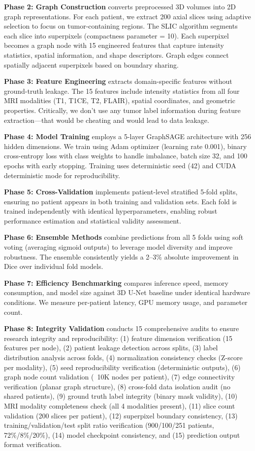 \textbf{Phase 2: Graph Construction} converts preprocessed 3D volumes into 2D graph representations. For each patient, we extract 200 axial slices using adaptive selection to focus on tumor-containing regions. The SLIC algorithm segments each slice into superpixels (compactness parameter = 10). Each superpixel becomes a graph node with 15 engineered features that capture intensity statistics, spatial information, and shape descriptors. Graph edges connect spatially adjacent superpixels based on boundary sharing.

\textbf{Phase 3: Feature Engineering} extracts domain-specific features without ground-truth leakage. The 15 features include intensity statistics from all four MRI modalities (T1, T1CE, T2, FLAIR), spatial coordinates, and geometric properties. Critically, we don't use any tumor label information during feature extraction—that would be cheating and would lead to data leakage.

\textbf{Phase 4: Model Training} employs a 5-layer GraphSAGE architecture with 256 hidden dimensions. We train using Adam optimizer (learning rate 0.001), binary cross-entropy loss with class weights to handle imbalance, batch size 32, and 100 epochs with early stopping. Training uses deterministic seed (42) and CUDA deterministic mode for reproducibility.

\textbf{Phase 5: Cross-Validation} implements patient-level stratified 5-fold splits, ensuring no patient appears in both training and validation sets. Each fold is trained independently with identical hyperparameters, enabling robust performance estimation and statistical validity assessment.

\textbf{Phase 6: Ensemble Methods} combine predictions from all 5 folds using soft voting (averaging sigmoid outputs) to leverage model diversity and improve robustness. The ensemble consistently yields a 2--3\% absolute improvement in Dice over individual fold models.

\textbf{Phase 7: Efficiency Benchmarking} compares inference speed, memory consumption, and model size against 3D U-Net baseline under identical hardware conditions. We measure per-patient latency, GPU memory usage, and parameter count.

\textbf{Phase 8: Integrity Validation} conducts 15 comprehensive audits to ensure research integrity and reproducibility: (1) feature dimension verification (15 features per node), (2) patient leakage detection across splits, (3) label distribution analysis across folds, (4) normalization consistency checks (Z-score per modality), (5) seed reproducibility verification (deterministic outputs), (6) graph node count validation (~10K nodes per patient), (7) edge connectivity verification (planar graph structure), (8) cross-fold data isolation audit (no shared patients), (9) ground truth label integrity (binary mask validity), (10) MRI modality completeness check (all 4 modalities present), (11) slice count validation (200 slices per patient), (12) superpixel boundary consistency, (13) training/validation/test split ratio verification (900/100/251 patients, 72\%/8\%/20\%), (14) model checkpoint consistency, and (15) prediction output format verification.


